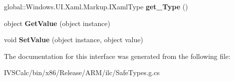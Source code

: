 \begin{DoxyCompactItemize}
global\+::\+Windows.\+U\+I.\+Xaml.\+Markup.\+I\+Xaml\+Type {\bfseries get\+\_\+\+Type} ()
\item 
\mbox{\label{interface_windows_1_1_u_i_1_1_xaml_1_1_markup_1_1_i_xaml_member_a6045d32112170a1fabf61d95c491e662}} 
object {\bfseries Get\+Value} (object instance)
\item 
\mbox{\label{interface_windows_1_1_u_i_1_1_xaml_1_1_markup_1_1_i_xaml_member_a226214a27d7755b22726eae10b5a0e5d}} 
void {\bfseries Set\+Value} (object instance, object value)
\end{DoxyCompactItemize}


The documentation for this interface was generated from the following file\+:\begin{DoxyCompactItemize}
\item 
I\+V\+S\+Calc/bin/x86/\+Release/\+A\+R\+M/ilc/Safe\+Types.\+g.\+cs\end{DoxyCompactItemize}
